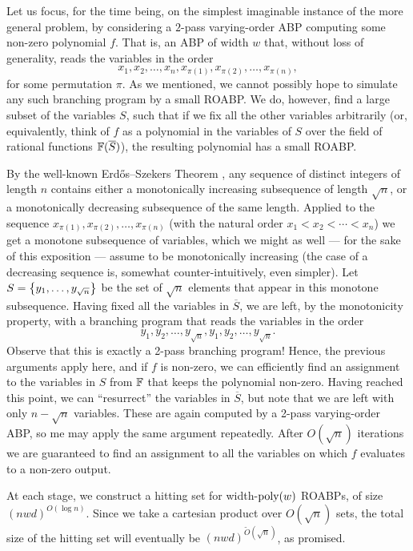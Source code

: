 \documentclass[11pt]{article}
\begin{document}
\medskip

Let us focus, for the time being, on the simplest imaginable instance of the more general problem, by considering a $2$-pass varying-order ABP computing some non-zero polynomial $f$. That is, an ABP of width $w$ that, without loss of generality, reads the variables in the order
\[
x_1, x_2, \ldots, x_n, x_{\pi(1)}, x_{\pi(2)},\ldots, x_{\pi(n)},
\]
for some permutation $\pi$. As we mentioned, we cannot possibly hope to simulate any such branching program by a small ROABP.  We do, however, find a large subset of the variables $S$, such that if we fix all the other variables arbitrarily (or, equivalently, think of $f$ as a polynomial in the variables of $S$ over the field of rational functions $\F(\overline{S})$), the resulting polynomial has a small ROABP.

By the well-known Erd\H{o}s--Szekers Theorem \cite{ES35}, any sequence of distinct integers of length $n$ contains either a monotonically increasing subsequence of length $\sqrt{n}$, or a monotonically decreasing subsequence of the same length. Applied to the sequence $x_{\pi(1)}, x_{\pi(2)},\ldots, x_{\pi(n)}$ (with the natural order $x_1 < x_2 < \cdots < x_n$) we get a monotone subsequence of variables, which we might as well --- for the sake of this exposition --- assume to be monotonically increasing (the case of a decreasing sequence is, somewhat counter-intuitively, even simpler). Let $S=\left\{ y_1, \ldots, y_{\sqrt{n}} \right\}$ be the set of $\sqrt{n}$ elements that appear in this monotone subsequence. Having fixed all the variables in $\overline{S}$, we are left, by the monotonicity property, with a branching program that reads the variables in the order
\[
y_1, y_2, \ldots, y_{\sqrt{n}}, y_{1}, y_{2},\ldots, y_{\sqrt{n}}.
\]
Observe that this is exactly a 2-pass branching program! Hence, the previous arguments apply here, and if $f$ is non-zero, we can efficiently find an assignment to the variables in $S$ from $\F$ that keeps the polynomial non-zero. Having reached this point, we can ``resurrect'' the variables in $\overline{S}$, but note that we are left with only $n-\sqrt{n}$ variables. These are again computed by a 2-pass varying-order ABP, so me may apply the same argument repeatedly. After $O(\sqrt{n})$ iterations we are guaranteed to find an assignment to all the variables on which $f$ evaluates to a non-zero output.

At each stage, we construct a hitting set for width-$\operatorname{poly}(w)$ ROABPs, of size $(nwd)^{O(\log n)}$. Since we take a cartesian product over $O(\sqrt{n})$ sets, the total size of the hitting set will eventually be $(nwd)^{\tilde{O}(\sqrt{n})}$, as promised.
\end{document}
